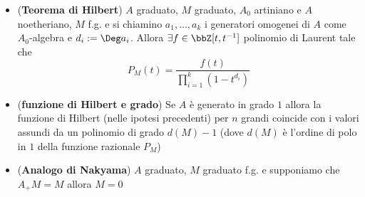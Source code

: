 \documentclass[a4paper,NoNotes,GeneralMath]{stdmdoc}
\begin{document}
\begin{itemize}
\item ({\bf Teorema di Hilbert}) $A$ graduato, $M$ graduato, $A_0$
  artiniano e $A$ noetheriano, $M$ f.g. e si chiamino $a_1, \ldots, a_k$
  i generatori omogenei di $A$ come $A_0$-algebra e $d_i := \Deg
  a_i$. Allora $\exists f \in \bbZ[t, t^{-1}]$ polinomio di Laurent tale
  che
  $$P_M(t) = \frac{f(t)}{\prod_{i=1}^k (1 - t^{d_i})}$$
\item ({\bf funzione di Hilbert e grado}) Se $A$ è generato in grado $1$
  allora la funzione di Hilbert (nelle ipotesi precedenti) per $n$
  grandi coincide con i valori assundi da un polinomio di grado $d(M) -
  1$ (dove $d(M)$ è l'ordine di polo in $1$ della funzione razionale
  $P_M$)
\item ({\bf Analogo di Nakyama}) $A$ graduato, $M$ graduato f.g. e
  supponiamo che $A_+ M = M$ allora $M = 0$
\end{itemize}
\end{document}
